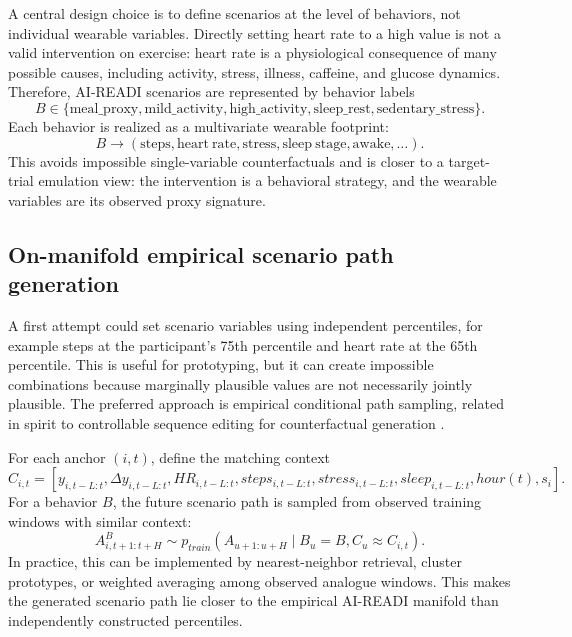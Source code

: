 A central design choice is to define scenarios at the level of behaviors, not individual wearable variables. Directly setting heart rate to a high value is not a valid intervention on exercise: heart rate is a physiological consequence of many possible causes, including activity, stress, illness, caffeine, and glucose dynamics. Therefore, AI-READI scenarios are represented by behavior labels
\begin{equation}
    B \in \{\mathrm{meal\_proxy},\mathrm{mild\_activity},\mathrm{high\_activity},
    \mathrm{sleep\_rest},\mathrm{sedentary\_stress}\}.
\end{equation}
Each behavior is realized as a multivariate wearable footprint:
\begin{equation}
    B \longrightarrow
    (\mathrm{steps}, \mathrm{heart\ rate}, \mathrm{stress}, \mathrm{sleep\ stage}, \mathrm{awake}, \ldots).
\end{equation}
This avoids impossible single-variable counterfactuals and is closer to a target-trial emulation view: the intervention is a behavioral strategy, and the wearable variables are its observed proxy signature.

\subsection{On-manifold empirical scenario path generation}
\label{subsec:on_manifold_generation}

A first attempt could set scenario variables using independent percentiles, for example steps at the participant's 75th percentile and heart rate at the 65th percentile. This is useful for prototyping, but it can create impossible combinations because marginally plausible values are not necessarily jointly plausible. The preferred approach is empirical conditional path sampling, related in spirit to controllable sequence editing for counterfactual generation \citep{li2025clef}.

For each anchor $(i,t)$, define the matching context
\begin{equation}
    C_{i,t} = \left[
    y_{i,t-L:t},
    \Delta y_{i,t-L:t},
    HR_{i,t-L:t},
    steps_{i,t-L:t},
    stress_{i,t-L:t},
    sleep_{i,t-L:t},
    hour(t),
    s_i
    \right].
    \label{eq:matching_context}
\end{equation}
For a behavior $B$, the future scenario path is sampled from observed training windows with similar context:
\begin{equation}
    A^{B}_{i,t+1:t+H}
    \sim
    p_{train}\left(A_{u+1:u+H}\mid B_u=B, C_u \approx C_{i,t}\right).
    \label{eq:empirical_scenario_sampling}
\end{equation}
In practice, this can be implemented by nearest-neighbor retrieval, cluster prototypes, or weighted averaging among observed analogue windows. This makes the generated scenario path lie closer to the empirical AI-READI manifold than independently constructed percentiles.

